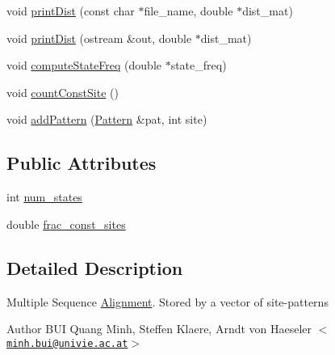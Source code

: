 \begin{DoxyCompactItemize}
\item 
void \hyperlink{classAlignment_ac99d17ec607ca7272c2d75686713865d}{printDist} (const char $\ast$file\_\-name, double $\ast$dist\_\-mat)
\item 
void \hyperlink{classAlignment_a2b951be4ee45b539683a0fd2692951fa}{printDist} (ostream \&out, double $\ast$dist\_\-mat)
\item 
void \hyperlink{classAlignment_aba9fa7f5358328bf5712049bb00ea2b6}{computeStateFreq} (double $\ast$state\_\-freq)
\item 
void \hyperlink{classAlignment_aa9a60448e5e8ac12bbf30557dfaf9018}{countConstSite} ()
\item 
void \hyperlink{classAlignment_a06ccd149a79b56d183752c560a9d8e1d}{addPattern} (\hyperlink{classPattern}{Pattern} \&pat, int site)
\end{DoxyCompactItemize}
\subsection*{Public Attributes}
\begin{DoxyCompactItemize}
\item 
int \hyperlink{classAlignment_aef8af61d49ceedd23bbec2c9f8a3adef}{num\_\-states}
\item 
double \hyperlink{classAlignment_a85715ac791c22f38ca74dc60198d5f23}{frac\_\-const\_\-sites}
\end{DoxyCompactItemize}


\subsection{Detailed Description}
Multiple Sequence \hyperlink{classAlignment}{Alignment}. Stored by a vector of site-\/patterns

\begin{DoxyAuthor}{Author}
BUI Quang Minh, Steffen Klaere, Arndt von Haeseler $<$\href{mailto:minh.bui@univie.ac.at}{\tt minh.bui@univie.ac.at}$>$ 
\end{DoxyAuthor}


